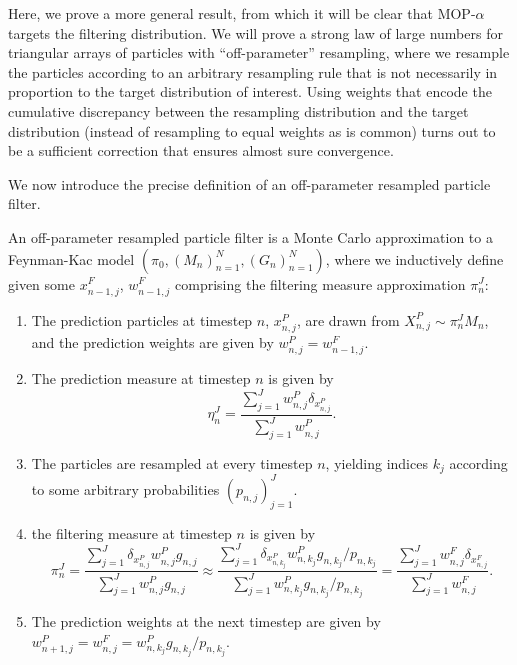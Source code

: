 

Here, we prove a more general result, from which it will be clear that MOP-$\alpha$ targets the filtering distribution. We will prove a strong law of large numbers for triangular arrays of particles with ``off-parameter'' resampling, where we resample the particles according to an arbitrary resampling rule that is not necessarily in proportion to the target distribution of interest. Using weights that encode the cumulative discrepancy between the resampling distribution and the target distribution (instead of resampling to equal weights as is common) turns out to be a sufficient correction that ensures almost sure convergence.

We now introduce the precise definition of an off-parameter resampled particle filter. 

\begin{defn}
    \label{defn:off-parameter-filter}
    An off-parameter resampled particle filter is a Monte Carlo approximation to a Feynman-Kac model $\left(\pi_0,\left(M_n\right)_{n=1}^N,\left(G_n\right)_{n=1}^N\right)$, where we inductively define given some $x_{n-1,j}^F$, $w_{n-1,j}^F$ comprising the filtering measure approximation $\pi_n^J$:
    \begin{enumerate}
        \item The prediction particles at timestep $n$, $x_{n,j}^P$, are drawn from $X_{n,j}^P \sim \pi_n^J M_n$, and the prediction weights are given by $w_{n,j}^P = w_{n-1,j}^F$. 
        \item The prediction measure at timestep $n$ is given by 
        $$\eta_n^J = \frac{\sum_{j=1}^J w_{n,j}^P \delta_{x_{n,j}^P}}{\sum_{j=1}^J w_{n,j}^P}.$$
        \item The particles are resampled at every timestep $n$, yielding indices $k_j$ according to some arbitrary probabilities $(p_{n,j})_{j=1}^J$.
        \item the filtering measure at timestep $n$ is given by
        $$\pi_n^J = \frac{\sum_{j=1}^J \delta_{x_{n,j}^P }w_{n,j}^P g_{n,j}}{\sum_{j=1}^J w_{n,j}^Pg_{n,j}} \approx \frac{\sum_{j=1}^J \delta_{x_{n,k_j}^P }w_{n,k_j}^P g_{n,k_j}/p_{n,k_j}}{\sum_{j=1}^J w_{n,k_j}^Pg_{n,k_j}/p_{n,k_j}} = \frac{\sum_{j=1}^J w_{n,j}^F \delta_{x_{n,j}^F}}{\sum_{j=1}^J w_{n,j}^F}.$$
        \item The prediction weights at the next timestep are given by $w_{n+1,j}^P = w_{n,j}^F =  w_{n,k_j}^P g_{n,k_j}/p_{n,k_j}$.
    \end{enumerate}
\end{defn}

